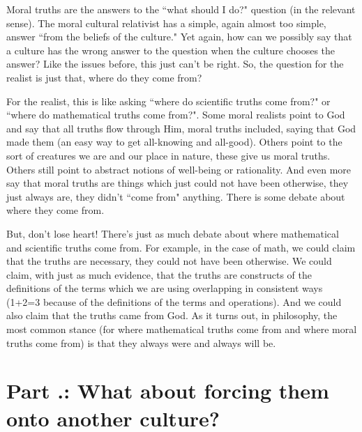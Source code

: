 Moral truths are the answers to the ``what should I do?" question (in the relevant sense). The moral cultural relativist has a simple, again almost too simple, answer ``from the beliefs of the culture." Yet again, how can we possibly say that a culture has the wrong answer to the question when the culture chooses the answer? Like the issues before, this just can't be right. So, the question for the realist is just that, where do they come from? 

For the realist, this is like asking ``where do scientific truths come from?" or ``where do mathematical truths come from?". Some moral realists point to God and say that all truths flow through Him, moral truths included, saying that God made them (an easy way to get all-knowing and all-good). Others point to the sort of creatures we are and our place in nature, these give us moral truths. Others still point to abstract notions of well-being or rationality.  And even more say that moral truths are things which just could not have been otherwise, they just always are, they didn't ``come from" anything. There is some debate about where they come from.

But, don't lose heart! There's just as much debate about where mathematical and scientific truths come from. For example, in the case of math, we could claim that the truths are necessary, they could not have been otherwise. We could claim, with just as much evidence, that the truths are constructs of the definitions of the terms which we are using overlapping in consistent ways (1+2=3 because of the definitions of the terms and operations). And we could also claim that the truths came from God.  As it turns out, in philosophy, the most common stance (for where mathematical truths come from and where moral truths come from) is that they always were and always will be.

\section{Part \thechapcount.\theseccount: What about forcing them onto another culture?}


